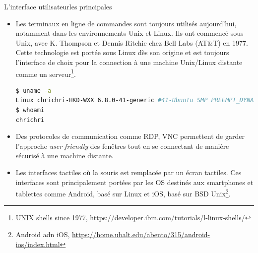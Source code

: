 \documentclass{beamer}
\begin{document}
    \begin{frame}[fragile]{L'interface utilisateur}{les principales}
        \begin{scriptsize}
            \begin{itemize}
                \item Les terminaux en ligne de commandes sont toujours utilisés aujourd'hui, notamment dans les environnements Unix et Linux.
                Ils ont commencé sous Unix, avec K. Thompson et Dennis Ritchie chez Bell Labs (AT\&T) en 1977.
                Cette technologie est portée sous Linux dès son origine et est toujours l'interface de choix pour la connection à une machine Unix/Linux distante comme un serveur\footnote{\label{ibmunix}UNIX shells since 1977, \url{https://developer.ibm.com/tutorials/l-linux-shells/}}.
                \begin{lstlisting}[language=bash]
$ uname -a
Linux chrichri-HKD-WXX 6.8.0-41-generic #41-Ubuntu SMP PREEMPT_DYNAMIC Fri Aug  2 20:41:06 UTC 2024 x86_64 x86_64 x86_64 GNU/Linux
$ whoami
chrichri
                \end{lstlisting}
                \item Des protocoles de communication comme RDP, VNC permettent de garder l'approche \textit{user friendly} des fenêtres tout en se connectant de manière sécurisé à une machine distante.
                \item Les interfaces tactiles où la souris est remplacée par un écran tactiles.
                Ces interfaces sont principalement portées par les OS destinés aux smartphones et tablettes comme Android, basé sur Linux et iOS, basé sur BSD Unix\footnote{Android adn iOS, \url{https://home.ubalt.edu/abento/315/android-ios/index.html}}.
            \end{itemize}
        \end{scriptsize}
    \end{frame}
\end{document}
